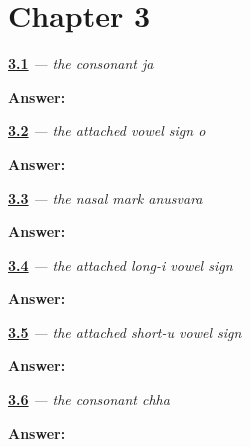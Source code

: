 \section*{Chapter 3}

\noindent\begin{minipage}[t]{\linewidth}
\raggedright
\hyperlink{review-GU-W03-ja-recall}{\textbf{3.1}} \emph{ — the consonant ja}\par
\small \textbf{Answer:} \par
\end{minipage}\par\medskip

\noindent\begin{minipage}[t]{\linewidth}
\raggedright
\hyperlink{review-GU-W03-o-matra-recall}{\textbf{3.2}} \emph{ — the attached vowel sign o}\par
\small \textbf{Answer:} \par
\end{minipage}\par\medskip

\noindent\begin{minipage}[t]{\linewidth}
\raggedright
\hyperlink{review-GU-W03-anusvara-recall}{\textbf{3.3}} \emph{ — the nasal mark anusvara}\par
\small \textbf{Answer:} \par
\end{minipage}\par\medskip

\noindent\begin{minipage}[t]{\linewidth}
\raggedright
\hyperlink{review-GU-W03-ii-matra-recall}{\textbf{3.4}} \emph{ — the attached long-i vowel sign}\par
\small \textbf{Answer:} \par
\end{minipage}\par\medskip

\noindent\begin{minipage}[t]{\linewidth}
\raggedright
\hyperlink{review-GU-W03-u-matra-recall}{\textbf{3.5}} \emph{ — the attached short-u vowel sign}\par
\small \textbf{Answer:} \par
\end{minipage}\par\medskip

\noindent\begin{minipage}[t]{\linewidth}
\raggedright
\hyperlink{review-GU-W03-chha-recall}{\textbf{3.6}} \emph{ — the consonant chha}\par
\small \textbf{Answer:} \par
\end{minipage}\par\medskip

